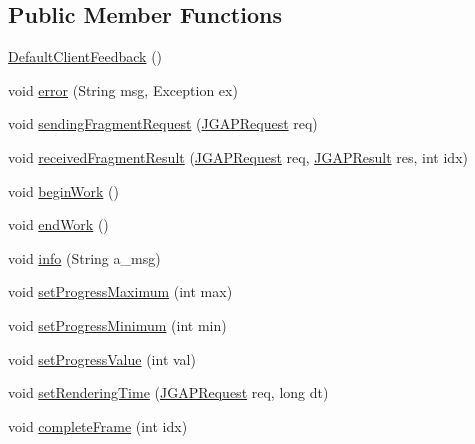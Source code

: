 \subsection*{Public Member Functions}
\begin{DoxyCompactItemize}
\item 
\hyperlink{classorg_1_1jgap_1_1distr_1_1grid_1_1_default_client_feedback_ae199c76ce290f8f7ab6ca60393b992ae}{Default\-Client\-Feedback} ()
\item 
void \hyperlink{classorg_1_1jgap_1_1distr_1_1grid_1_1_default_client_feedback_a5d1d21b9d1f4beaea22803a091e6417e}{error} (String msg, Exception ex)
\item 
void \hyperlink{classorg_1_1jgap_1_1distr_1_1grid_1_1_default_client_feedback_a1282281ecae2995a1ec40e58ccb82b62}{sending\-Fragment\-Request} (\hyperlink{classorg_1_1jgap_1_1distr_1_1grid_1_1_j_g_a_p_request}{J\-G\-A\-P\-Request} req)
\item 
void \hyperlink{classorg_1_1jgap_1_1distr_1_1grid_1_1_default_client_feedback_a749d4d6a6af75c32c7d3bc4979d7e5b5}{received\-Fragment\-Result} (\hyperlink{classorg_1_1jgap_1_1distr_1_1grid_1_1_j_g_a_p_request}{J\-G\-A\-P\-Request} req, \hyperlink{classorg_1_1jgap_1_1distr_1_1grid_1_1_j_g_a_p_result}{J\-G\-A\-P\-Result} res, int idx)
\item 
void \hyperlink{classorg_1_1jgap_1_1distr_1_1grid_1_1_default_client_feedback_a272c46fe1df8605f7fbab2d23fe720dc}{begin\-Work} ()
\item 
void \hyperlink{classorg_1_1jgap_1_1distr_1_1grid_1_1_default_client_feedback_a2f681666332f53089f749d1eb6e83c1e}{end\-Work} ()
\item 
void \hyperlink{classorg_1_1jgap_1_1distr_1_1grid_1_1_default_client_feedback_a0b2d1ec3d63543cbd70e39d6b88f048a}{info} (String a\-\_\-msg)
\item 
void \hyperlink{classorg_1_1jgap_1_1distr_1_1grid_1_1_default_client_feedback_ac81bdb37eb045bef2d3cb4d0a4f0826f}{set\-Progress\-Maximum} (int max)
\item 
void \hyperlink{classorg_1_1jgap_1_1distr_1_1grid_1_1_default_client_feedback_ac4d2a8294ba8a30bab2592577a24549a}{set\-Progress\-Minimum} (int min)
\item 
void \hyperlink{classorg_1_1jgap_1_1distr_1_1grid_1_1_default_client_feedback_a2d45cee2a8ece59a55f8dd26c51a6c9d}{set\-Progress\-Value} (int val)
\item 
void \hyperlink{classorg_1_1jgap_1_1distr_1_1grid_1_1_default_client_feedback_aa0f5b6b73c8e2ecbd8fb44cf0c2b3f9a}{set\-Rendering\-Time} (\hyperlink{classorg_1_1jgap_1_1distr_1_1grid_1_1_j_g_a_p_request}{J\-G\-A\-P\-Request} req, long dt)
\item 
void \hyperlink{classorg_1_1jgap_1_1distr_1_1grid_1_1_default_client_feedback_a1b90cfa5508f6768bf31f605af88dbc2}{complete\-Frame} (int idx)
\end{DoxyCompactItemize}
